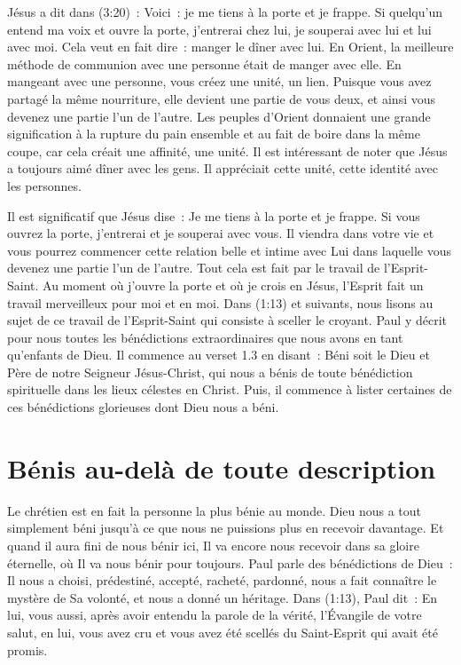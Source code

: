 Jésus a dit dans (3:20)~:
 \og Voici~: je me tiens à la porte et je frappe.
 Si quelqu'un entend ma voix et ouvre la porte,
 j'entrerai chez lui, je souperai avec lui et lui avec moi. \fg{}
 Cela veut en fait dire~: \og manger le dîner avec lui. \fg{}
 En Orient, la meilleure méthode de communion avec une personne
 était de manger avec elle. En mangeant avec une personne,
 vous créez une unité, un lien.
 Puisque vous avez partagé la même nourriture, elle devient une partie
 de vous deux, et ainsi vous devenez une partie l'un de l'autre.
 Les peuples d'Orient donnaient une grande signification à la rupture
 du pain ensemble et au fait de boire dans la même coupe,
 car cela créait une affinité, une unité.
 Il est intéressant de noter que Jésus a toujours aimé dîner avec les gens.
 Il appréciait cette unité, cette identité avec les personnes.


Il est significatif que Jésus dise~:
 \og Je me tiens à la porte et je frappe.
 Si vous ouvrez la porte, j'entrerai et je souperai avec vous. \fg{}
 Il viendra dans votre vie et vous pourrez commencer cette relation belle
 et intime avec Lui dans laquelle vous devenez une partie l'un de l'autre.
 Tout cela est fait par le travail de l'Esprit-Saint.
 Au moment où j'ouvre la porte et où je crois en Jésus,
 l'Esprit fait un travail merveilleux pour moi et en moi.
 Dans (1:13) et suivants, nous lisons au sujet de ce travail
 de l'Esprit-Saint qui consiste à sceller le croyant.
 Paul y décrit pour nous toutes les bénédictions extraordinaires
 que nous avons en tant qu'enfants de Dieu.
 Il commence au verset 1.3 en disant~:
 \og Béni soit le Dieu et Père de notre Seigneur Jésus-Christ,
 qui nous a bénis de toute bénédiction spirituelle
 dans les lieux célestes en Christ. \fg{}
 Puis, il commence à lister certaines de ces bénédictions glorieuses
 dont Dieu nous a béni.


\section*{Bénis au-delà de toute description}

Le chrétien est en fait la personne la plus bénie au monde.
 Dieu nous a tout simplement béni jusqu'à ce que nous ne puissions plus
 en recevoir davantage.
 Et quand il aura fini de nous bénir ici, Il va encore nous recevoir
 dans sa gloire éternelle, où Il va nous bénir pour toujours.
 Paul parle des bénédictions de Dieu~: Il nous a choisi, prédestiné,
 accepté, racheté, pardonné, nous a fait connaître
 le mystère de Sa volonté, et nous a donné un héritage.
 Dans (1:13), Paul dit~:
 \og En lui, vous aussi, après avoir entendu la parole de la vérité,
 l'Évangile de votre salut, en lui, vous avez cru et vous avez été scellés
 du Saint-Esprit qui avait été promis. \fg{}

